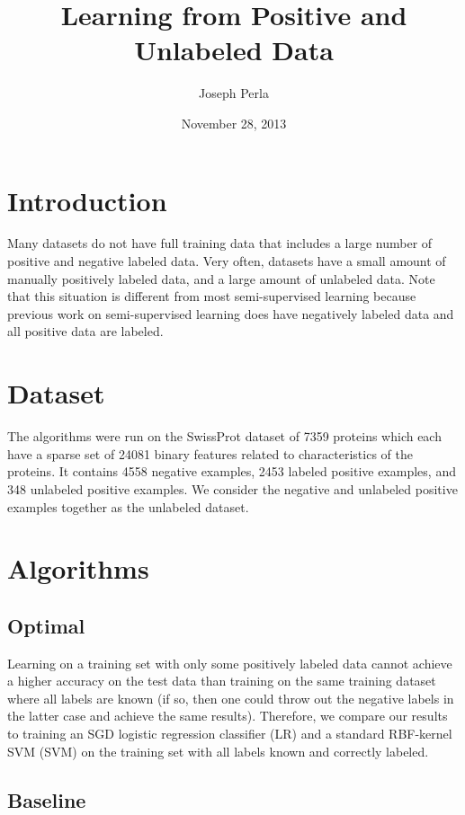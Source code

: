 \documentclass[]{article}
\begin{document}
\title{Learning from Positive and Unlabeled Data}
\author{Joseph Perla}
\date{November 28, 2013}
\maketitle

\section{Introduction}

Many datasets do not have full training data that includes a large number of positive and negative labeled data.  Very often, datasets have a small amount of manually positively labeled data, and a large amount of unlabeled data.  Note that this situation is different from most semi-supervised learning because previous work on semi-supervised learning does have negatively labeled data and all positive data are labeled.

\section{Dataset}

The algorithms were run on the SwissProt\cite{elkan08} dataset of 7359 proteins which each have a sparse set of 24081 binary features related to characteristics of the proteins. It contains 4558 negative examples, 2453 labeled positive examples, and 348 unlabeled positive examples.   We consider the negative and unlabeled positive examples together as the unlabeled dataset.

\section{Algorithms}

\subsection{Optimal}
Learning on a training set with only some positively labeled data cannot achieve a higher accuracy on the test data than training on the same training dataset where all labels are known (if so, then one could throw out the negative labels in the latter case and achieve the same results).  Therefore, we compare our results to training an SGD logistic regression classifier (LR) and a standard RBF-kernel SVM (SVM) on the training set with all labels known and correctly labeled.

\subsection{Baseline}
\end{document}
